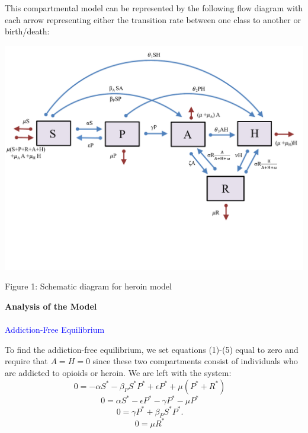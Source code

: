 \documentclass[12pt]{article}
\begin{document}
This compartmental model can be represented by the following flow diagram with each arrow representing either the transition rate between one class to another or birth/death: 

\includegraphics[scale=0.6]{heroin_schematic.pdf}
\vspace{-0.8cm}
\begin{center}
Figure 1: Schematic diagram for heroin model
\end{center}



\textbf{Analysis of the Model} \\ \\

 \textcolor{blue}{Addiction-Free Equilibrium} 

To find the addiction-free equilibrium, we set equations (1)-(5) equal to zero and require that $A=H=0$ since these two compartments consist of individuals who are addicted to opioids or heroin. We are left with the system: \\
\[0=-\alpha S^* -\beta_{P} S^* P^* + \epsilon P^* +\mu (P^* + R^*) \quad\]
\[0=\alpha S^* - \epsilon P^* -\gamma P^* - \mu P^* \quad\]
\[0=\gamma P^* + \beta_{P} S^* P^*.   \quad\]
\[0=\mu R^* \quad\]
\end{document}
